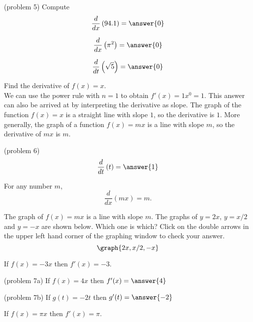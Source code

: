 \documentclass{ximera}
\begin{document}
\begin{problem}(problem 5)
Compute
\[
\frac{d}{dx} \left(94.1\right) = \answer{0}
\]

\[
\frac{d}{dx} \left(\pi^2\right) = \answer{0}
\]

\[
\frac{d}{dt} \left( \sqrt 5 \right) = \answer{0}
\]


\end{problem}



\begin{example}[example 6]
Find the derivative of $f(x) = x$.\\
We can use the power rule with $n=1$ to obtain $f'(x) = 1x^0 = 1$. 
This answer can also be arrived at by interpreting the derivative as slope. The graph of the function $f(x) = x$ is a straight line with slope $1$,
so the derivative is $1$.  More generally, the graph of a function $f(x) = mx$
is a line with slope $m$, so the derivative of $mx$ is $m$.
\end{example}

\begin{problem}(problem 6)
\[
\frac{d}{dt}\left(t\right) = \answer{1}
\]
\end{problem}


\begin{proposition}
For any number $m$,
\[
\frac{d}{dx} (mx) = m.
\]
\end{proposition}


The graph of $f(x) = mx$ is a line with slope $m$.
The graphs of $y = 2x$, $y = x/2$ and $y = -x$ are shown below.
Which one is which? Click on the double arrows in the upper left hand corner of the graphing window to check your answer.
\[
\graph{2x, x/2, -x}
\]



\begin{example}[example 7]
If $f(x) = -3x$ then $f'(x) = -3$.
\end{example}



\begin{problem}(problem 7a)
If $f(x) = 4x$ then $f'(x) = \answer{4}$
\end{problem}

\begin{problem}(problem 7b)
If $g(t) = -2t$ then $g'(t) = \answer{-2}$
\end{problem}



\begin{example}[example 8]
If $f(x) = \pi x$ then $f'(x) = \pi$.
\end{example}
\end{document}
